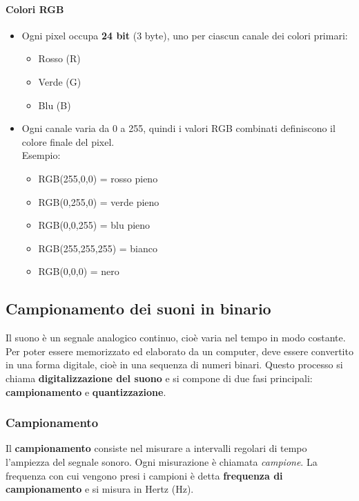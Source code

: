 \documentclass[12pt]{article}
\begin{document}
\paragraph{Colori RGB} 
\begin{itemize}
  \item Ogni pixel occupa \textbf{24 bit} (3 byte), uno per ciascun canale dei colori primari:  
  \begin{itemize}
    \item Rosso (R)
    \item Verde (G)
    \item Blu (B)
  \end{itemize}  
  \item Ogni canale varia da 0 a 255, quindi i valori RGB combinati definiscono il colore finale del pixel.\\
  Esempio:  
  \begin{itemize}
    \item RGB(255,0,0) = rosso pieno
    \item RGB(0,255,0) = verde pieno
    \item RGB(0,0,255) = blu pieno
    \item RGB(255,255,255) = bianco
    \item RGB(0,0,0) = nero
  \end{itemize}
\end{itemize} 


\subsection{Campionamento dei suoni in binario}

Il suono è un segnale analogico continuo, cioè varia nel tempo in modo costante. Per poter essere memorizzato ed elaborato da un computer, deve essere convertito in una forma digitale, cioè in una sequenza di numeri binari.  
Questo processo si chiama \textbf{digitalizzazione del suono} e si compone di due fasi principali: \textbf{campionamento} e \textbf{quantizzazione}.

\subsubsection{Campionamento}

Il \textbf{campionamento} consiste nel misurare a intervalli regolari di tempo l’ampiezza del segnale sonoro.  
Ogni misurazione è chiamata \textit{campione}.  
La frequenza con cui vengono presi i campioni è detta \textbf{frequenza di campionamento} e si misura in Hertz (Hz).
\end{document}
